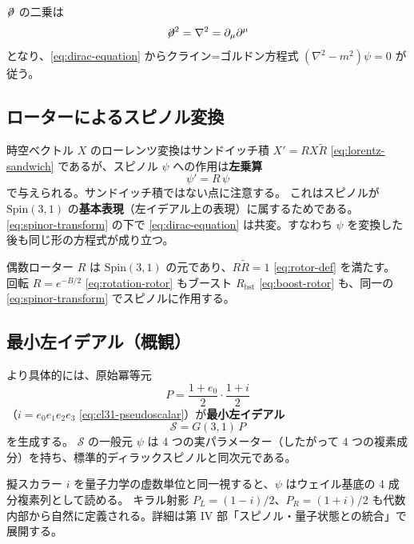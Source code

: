 \documentclass[dvipdfmx,a4paper,oneside]{jsbook}
\numberwithin{equation}{chapter}
\begin{document}
\(\not\!\partial\) の二乗は
\begin{equation}
  \not\!\partial^2 = \nabla^2 = \partial_\mu \partial^\mu
  \label{eq:dirac-squared}
\end{equation}
となり、\eqref{eq:dirac-equation} からクライン=ゴルドン方程式 \((\nabla^2 - m^2)\psi = 0\) が従う。

\subsection{ローターによるスピノル変換}

時空ベクトル \(X\) のローレンツ変換はサンドイッチ積 \(X' = RX\widetilde{R}\) \eqref{eq:lorentz-sandwich} であるが、スピノル \(\psi\) への作用は\textbf{左乗算}
\begin{equation}
  \psi' = R\,\psi
  \label{eq:spinor-transform}
\end{equation}
で与えられる。サンドイッチ積ではない点に注意する。
これはスピノルが \(\mathrm{Spin}(3,1)\) の\textbf{基本表現}（左イデアル上の表現）に属するためである。
\eqref{eq:spinor-transform} の下で \eqref{eq:dirac-equation} は共変。すなわち \(\psi\) を変換した後も同じ形の方程式が成り立つ。

偶数ローター \(R\) は \(\mathrm{Spin}(3,1)\) の元であり、\(R\widetilde{R}=1\) \eqref{eq:rotor-def} を満たす。
回転 \(R = e^{-B/2}\) \eqref{eq:rotation-rotor} もブースト \(R_{\mathrm{bst}}\) \eqref{eq:boost-rotor} も、同一の \eqref{eq:spinor-transform} でスピノルに作用する。

\subsection{最小左イデアル（概観）}

より具体的には、原始冪等元
\begin{equation}
  P = \frac{1 + e_0}{2}\cdot\frac{1 + i}{2}
  \label{eq:spinor-idempotent}
\end{equation}
（\(i = e_0 e_1 e_2 e_3\) \eqref{eq:cl31-pseudoscalar}）が\textbf{最小左イデアル}
\begin{equation}
  \mathcal{S} = G(3,1)\,P
  \label{eq:minimal-left-ideal}
\end{equation}
を生成する。
\(\mathcal{S}\) の一般元 \(\psi\) は 4 つの実パラメーター（したがって 4 つの複素成分）を持ち、標準的ディラックスピノルと同次元である。

擬スカラー \(i\) を量子力学の虚数単位と同一視すると、\(\psi\) はウェイル基底の 4 成分複素列として読める。
キラル射影 \(P_L = (1-i)/2\)、\(P_R = (1+i)/2\) も代数内部から自然に定義される。詳細は第 IV 部「スピノル・量子状態との統合」で展開する。
\end{document}
